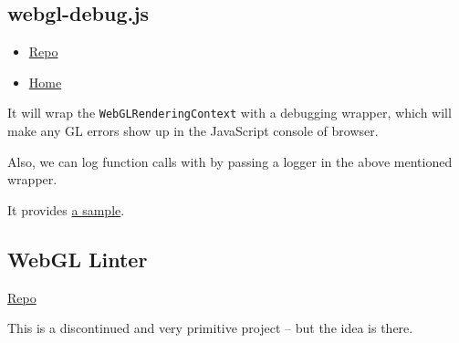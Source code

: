 \subsection{webgl-debug.js}\label{webgl-debug.js}

\begin{itemize}
\tightlist
\item
  \href{https://github.com/KhronosGroup/WebGLDeveloperTools}{Repo}
\item
  \href{https://www.khronos.org/webgl/wiki/Debugging}{Home}
\end{itemize}

It will wrap the \texttt{WebGLRenderingContext} with a debugging
wrapper, which will make any GL errors show up in the JavaScript console
of browser.

Also, we can log function calls with by passing a logger in the above
mentioned wrapper.

It provides
\href{https://github.com/KhronosGroup/WebGLDeveloperTools/blob/master/src/debug/debug-sample.html}{a
sample}.

\subsection{WebGL Linter}\label{webgl-linter}

\href{https://github.com/CharlesLillo/WebGL_Linter}{Repo}

This is a discontinued and very primitive project -- but the idea is
there.
